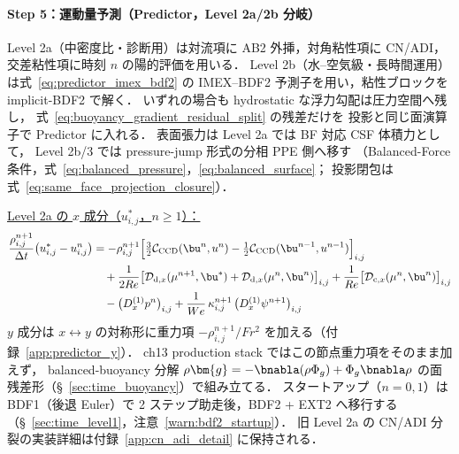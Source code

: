 \begin{tcolorbox}[algbox, title={1 タイムステップ $t^n \to t^{n+1}$ の完全アルゴリズム}]
\paragraph{Step 5：運動量予測（Predictor，Level 2a/2b 分岐）}
Level 2a（中密度比・診断用）は対流項に AB2 外挿，対角粘性項に CN/ADI，
交差粘性項に時刻 $n$ の陽的評価を用いる．
Level 2b（水--空気級・長時間運用）は式~\eqref{eq:predictor_imex_bdf2} の
IMEX--BDF2 予測子を用い，粘性ブロックを implicit-BDF2 で解く．
いずれの場合も hydrostatic な浮力勾配は圧力空間へ残し，
式~\eqref{eq:buoyancy_gradient_residual_split} の残差だけを
投影と同じ面演算子で Predictor に入れる．
表面張力は Level 2a では BF 対応 CSF 体積力として，
Level 2b/3 では pressure-jump 形式の分相 PPE 側へ移す
（Balanced-Force 条件，式~\eqref{eq:balanced_pressure}，\eqref{eq:balanced_surface}；
投影閉包は式~\eqref{eq:same_face_projection_closure}）．

\medskip
\underline{Level 2a の $x$ 成分（$u^*_{i,j}$，$n \ge 1$）：}
\begin{align*}
  \frac{\rho^{n+1}_{i,j}}{\Delta t}\bigl(u^*_{i,j} - u^n_{i,j}\bigr)
  &= -\rho^{n+1}_{i,j}\Bigl[
      \tfrac{3}{2}\mathcal{C}_{\text{CCD}}(\bu^n, u^n)
      -\tfrac{1}{2}\mathcal{C}_{\text{CCD}}(\bu^{n-1}, u^{n-1})
    \Bigr]_{i,j} \\
  &\quad + \frac{1}{2Re}\bigl[
      \mathcal{D}_{\mathrm{d},x}(\mu^{n+1}, \bu^*)
      + \mathcal{D}_{\mathrm{d},x}(\mu^n, \bu^n)
    \bigr]_{i,j}
    + \frac{1}{Re}\bigl[\mathcal{D}_{\mathrm{c},x}(\mu^n, \bu^n)\bigr]_{i,j} \\
  &\quad - \bigl(D_x^{(1)} p^n\bigr)_{i,j}
         + \frac{1}{We}\,\kappa^{n+1}_{i,j}\,\bigl(D_x^{(1)}\psi^{n+1}\bigr)_{i,j}
\end{align*}
$y$ 成分は $x \leftrightarrow y$ の対称形に重力項
$-\rho^{n+1}_{i,j}/Fr^2$ を加える（付録~\ref{app:predictor_y}）．
ch13 production stack ではこの節点重力項をそのまま加えず，
balanced-buoyancy 分解
$\rho\bm{g}=-\bnabla(\rho\Phi_g)+\Phi_g\bnabla\rho$ の面残差形（§~\ref{sec:time_buoyancy}）で組み立てる．
スタートアップ（$n=0,1$）は BDF1（後退 Euler）で 2 ステップ助走後，BDF2 + EXT2 へ移行する
（§~\ref{sec:time_level1}，注意~\ref{warn:bdf2_startup}）．
旧 Level 2a の CN/ADI 分裂の実装詳細は付録~\ref{app:cn_adi_detail} に保持される．


\end{tcolorbox}
